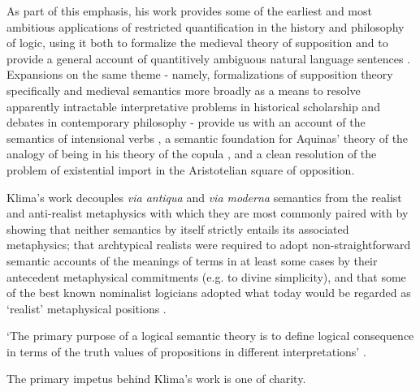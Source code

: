 \documentclass[]{article}
\begin{document}
As part of this emphasis, 
his work provides some of the earliest and most ambitious applications of restricted quantification in the history and philosophy of logic, 
using it both to formalize the medieval theory of supposition and to provide a general account of quantitively ambiguous natural language sentences \autocite{Klima1988,Klima1990,KlimaSandu1990,Klima1991b}. 
Expansions on the same theme - 
namely, formalizations of supposition theory specifically and medieval semantics more broadly as a means to resolve apparently intractable interpretative problems in historical scholarship and debates in contemporary philosophy - 
provide us with an account of the semantics of intensional verbs \autocite{Klima1991}, 
a semantic foundation for Aquinas' theory of the analogy of being in his theory of the copula \autocite{Klima1996,Klima2002}, 
and a clean resolution of the problem of existential import in the Aristotelian square of opposition\autocite{Klima2001}. 

Klima's work decouples \emph{via antiqua} and \emph{via moderna} semantics from the realist and anti-realist metaphysics with which they are most commonly paired with by showing 
that neither semantics by itself strictly entails its associated metaphysics; 
that archtypical realists were required to adopt non-straightforward semantic accounts of the meanings of terms in at least some cases by their antecedent metaphysical commitments (e.g. to divine simplicity),
and that some of the best known nominalist logicians adopted what today would be regarded as `realist' metaphysical positions \autocite{Klima1999,Klima2005,Klima2011}. 



\autocite{Parsons2014,Read2015b}

`The primary purpose of a logical semantic theory is to define logical consequence in terms of the truth values of propositions in different interpretations' \autocite[79]{Klima1991b}. 

The primary impetus behind Klima's work is one of charity.
\end{document}
